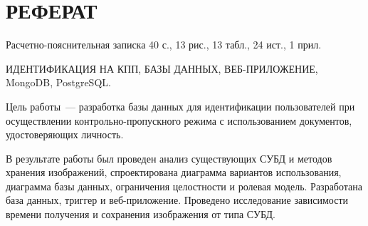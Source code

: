 \chapter*{РЕФЕРАТ}

Расчетно-пояснительная записка 40 с., 13 рис., 13 табл., 24 ист., 1 прил.

ИДЕНТИФИКАЦИЯ НА КПП, БАЗЫ ДАННЫХ, ВЕБ-ПРИЛОЖЕНИЕ, MongoDB, PostgreSQL.

Цель работы~--- разработка базы данных для идентификации пользователей при осуществлении контрольно-пропускного режима с использованием документов, удостоверяющих личность.

В результате работы был проведен анализ существующих СУБД и методов хранения изображений, спроектирована диаграмма вариантов использования, диаграмма базы данных, ограничения целостности и ролевая модель.
Разработана база данных, триггер и веб-приложение.
Проведено исследование зависимости времени получения и сохранения изображения от типа СУБД.